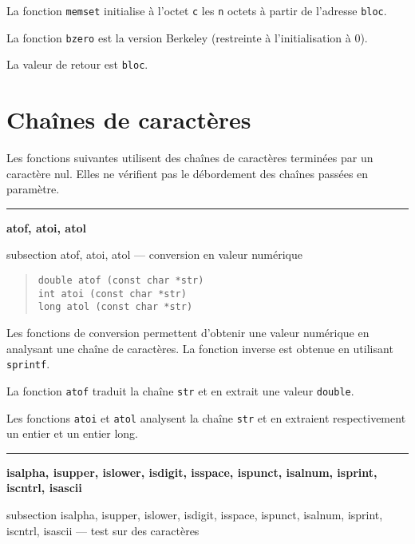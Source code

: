 \documentclass [twoside] {report}
\newcommand {\primitive} [1]
    {
	\phantomsection
	{\large \bf #1}
	\addcontentsline {toc} {subsection} {#1}
    }
\newcommand {\separation}
    {
	\vspace {5mm}
	\nopagebreak
	\hrule
    }
\begin{document}
La fonction {\tt memset} initialise à l'octet {\tt c} les {\tt n}
octets à partir de l'adresse {\tt bloc}.

La fonction {\tt bzero} est la version Berkeley (restreinte à
l'initialisation à 0).

La valeur de retour est {\tt bloc}.




\section {Chaînes de caractères}



Les fonctions suivantes utilisent des chaînes de caractères
terminées par un caractère nul. Elles ne vérifient pas le
débordement des chaînes passées en paramètre.




\separation
\primitive {atof, atoi, atol} --- conversion en valeur numérique


\begin {quote}
\begin {verbatim}
double atof (const char *str)
int atoi (const char *str)
long atol (const char *str)
\end{verbatim}
\end {quote}

Les fonctions de conversion permettent d'obtenir une valeur
numérique en analysant une chaîne de caractères. La fonction
inverse est obtenue en utilisant {\tt sprintf}.

La fonction {\tt atof} traduit la chaîne {\tt str} et en extrait une
valeur {\tt double}.

Les fonctions {\tt atoi} et {\tt atol} analysent la chaîne
{\tt str} et en extraient respectivement un entier et un entier
long.


\separation 
\primitive {isalpha, isupper, islower, isdigit, isspace, ispunct, isalnum, \mbox {isprint}, iscntrl, isascii} --- test sur des caractères
\end{document}

